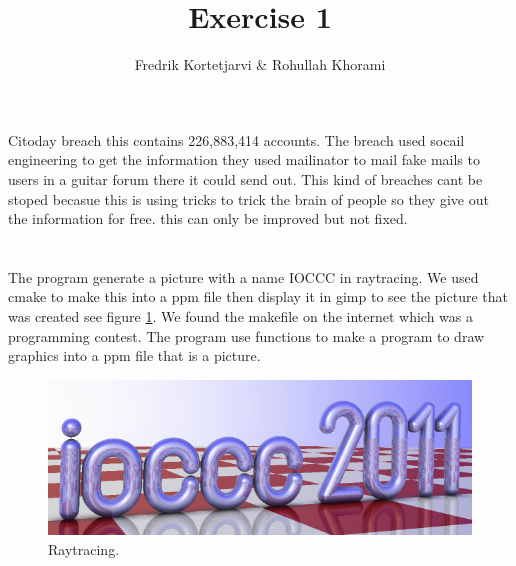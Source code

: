 \documentclass{article}
\author{Fredrik Kortetjarvi \& Rohullah Khorami}
\title{Exercise 1}
\begin{document}
    \maketitle
    \section{}
        Citoday breach this contains 226,883,414 accounts. The breach used socail engineering to get the information they used mailinator to 
        mail fake mails to users in a guitar forum there it could send out. This kind of breaches cant be stoped becasue this is using tricks 
        to trick the brain of people so they give out the information for free. this can only be improved but not fixed.\cite{cit0day} 
    \section{}
        The program generate a picture with a name IOCCC in raytracing.
        We used cmake to make this into a ppm file then 
        display it in gimp to see the picture that was created see figure \ref{fig:Zucker}. We found the makefile
        on the internet which was a programming contest. The program use functions to make a program to 
        draw graphics into a ppm file that is a picture.\cite{zucker}
        \begin{figure}
            \includegraphics[width=\linewidth]{image.jpg}
            \caption{Raytracing.}
            \label{fig:Zucker}
        \end{figure}
\end{document}
